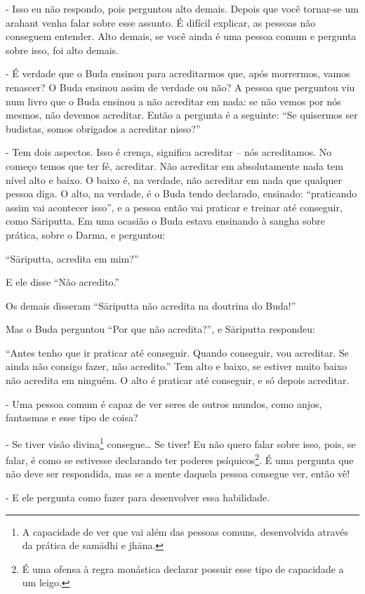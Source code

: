 - Isso eu não respondo, pois perguntou alto demais. Depois que
você tornar-se um arahant venha falar sobre esse assunto. É difícil
explicar, as pessoas não conseguem entender. Alto demais, se você ainda
é uma pessoa comum e pergunta sobre isso, foi alto demais.

- É verdade que o Buda ensinou para acreditarmos que, após
morrermos, vamos renascer? O Buda ensinou assim de verdade ou não? A
pessoa que perguntou viu num livro que o Buda ensinou a não acreditar
em nada: se não vemos por nós mesmos, não devemos acreditar. Então a
pergunta é a seguinte: “Se quisermos ser budistas, somos obrigados a
acreditar nisso?”

- Tem dois aspectos. Isso é crença, significa acreditar – nós
acreditamos. No começo temos que ter fé, acreditar. Não acreditar em
absolutamente nada tem nível alto e baixo. O baixo é, na verdade, não
acreditar em nada que qualquer pessoa diga. O alto, na verdade, é o
Buda tendo declarado, ensinado: “praticando assim vai acontecer isso”,
e a pessoa então vai praticar e treinar até conseguir, como
S\=ariputta. Em uma ocasião o Buda estava ensinando à sangha sobre
prática, sobre o Darma, e perguntou:

“S\=ariputta, acredita em mim?” 

E ele disse “Não acredito.” 

Os demais disseram “S\=ariputta não acredita na doutrina do Buda!”

Mas o Buda perguntou “Por que não acredita?”, e S\=ariputta
respondeu:

“Antes tenho que ir praticar até conseguir. Quando conseguir, vou
acreditar. Se ainda não consigo fazer, não acredito.” Tem alto e baixo,
se estiver muito baixo não acredita em ninguém. O alto é praticar até
conseguir, e só depois acreditar.

- Uma pessoa comum é capaz de ver seres de outros mundos, como
anjos, fantasmas e esse tipo de coisa?

- Se tiver visão divina\footnote{A capacidade de ver que vai além
das pessoas comuns, desenvolvida através da prática de sam\=adhi e
jh\=ana.} consegue… Se tiver! Eu não quero falar sobre isso, pois, se
falar, é como se estivesse declarando ter poderes psíquicos\footnote{É
uma ofensa à regra monástica declarar possuir esse tipo de capacidade a
um leigo.}. É uma pergunta que não deve ser respondida, mas se a mente
daquela pessoa consegue ver, então vê!

- E ele pergunta como fazer para desenvolver essa habilidade.


